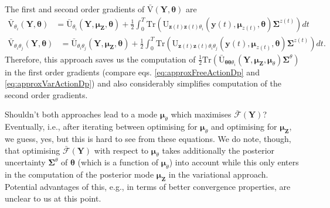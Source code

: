 \documentclass[a4paper,10pt]{article}
\newcommand{\bs}[1]{\mathbf{#1}}					%
\newcommand{\bgs}[1]{\boldsymbol{#1}}				%
\newcommand{\trace}[1]{\mathrm{Tr}\left(#1\right)}					%
\renewcommand{\ss}{z}         %
\newcommand{\so}{y}         %
\renewcommand{\sp}{\theta}    %
\newcommand{\ps}{\bs{\ss}}    %
\newcommand{\po}{\bs{\so}}    %
\newcommand{\pp}{\bgs{\sp}} %
\newcommand{\Ps}{\bs{Z}}    %
\newcommand{\Po}{\bs{Y}}    %
\newcommand{\U}{\mathrm{U}}			%
\newcommand{\Ua}{\bar{\mathrm{U}}}		%
\newcommand{\Va}{\bar{\mathrm{V}}}		%
\newcommand{\Fa}{\bar{\mathcal{F}}}		%
\newcommand{\Cov}{\bgs{\Sigma}}			%
\begin{document}
The first and second order gradients of $\Va(\Po,\pp)$ are
\begin{align}
    \Va_{\sp_i}(\Po,\pp) &= \label{eq:approxVarActionDp} \Ua_{\sp_i}(\Po,\bgs{\mu}_\Ps,\pp) + \frac{1}{2}\int_0^T \trace{\U_{\ps(t)\ps(t)\sp_i}(\po(t),\bgs{\mu}_{\ss(t)},\pp)\Cov^{\ss(t)}}dt
\end{align}
\begin{align}
    \Va_{\sp_i\sp_j}(\Po,\pp) &= \label{eq:approxVarActionDpp} \Ua_{\sp_i\sp_j}(\Po,\bgs{\mu}_\Ps,\pp) + \frac{1}{2}\int_0^T \trace{\U_{\ps(t)\ps(t)\sp_i\sp_j}(\po(t),\bgs{\mu}_{\ss(t)},\pp)\Cov^{\ss(t)}}dt.
\end{align}
Therefore, this approach saves us the computation of $\frac{1}{2}\trace{\Ua_{\pp\pp\sp_i}(\Po,\bgs{\mu}_\Ps,\bgs{\mu}_\sp)\Cov^\sp}$ in the first order gradients (compare eqs. \ref{eq:approxFreeActionDp} and \ref{eq:approxVarActionDp}) and also considerably simplifies computation of the second order gradients. 

Shouldn't both approaches lead to a mode $\bgs{\mu}_\sp$ which maximises $\Fa(\Po)$? Eventually, i.e., after iterating between optimising for $\bgs{\mu}_\sp$ and optimising for $\bgs{\mu}_\Ps$, we guess, yes, but this is hard to see from these equations. We do note, though, that optimising $\Fa(\Po)$ with respect to $\bgs{\mu}_\sp$ takes additionally the posterior uncertainty $\Cov^\sp$ of $\pp$ (which is a function of $\bgs{\mu}_\sp$) into account while this only enters in the computation of the posterior mode $\bgs{\mu}_\Ps$ in the variational approach. Potential advantages of this, e.g., in terms of better convergence properties, are unclear to us at this point.
\end{document}
